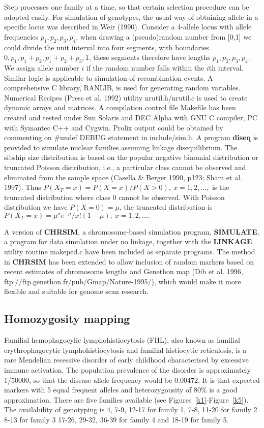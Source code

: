Step  processes one family at a time, so that certain selection
procedure can be adopted easily.  For simulation of genotypes, the usual way of
obtaining allele in a specific locus was described in Weir (1990).  Consider a
4-allele locus with allele frequencies $p_1, p_2, p_3, p_4$, when drawing a
(pseudo)random number from [0,1] we could divide the unit interval into four
segments, with boundaries $0, p_1, p_1+p_2, p_1+p_2+p_3, 1$, these segments
therefore have lengths $p_1, p_2, p_3, p_4$.  We assign allele number $i$ if
the random number falls within the $i$th interval.  Similar logic is applicable
to simulation of recombination events.  A comprehensive C library, RANLIB, is
used for generating random variables.  Numerical Recipes (Press et al.  1992)
utility nrutil.h/nrutil.c is used to create dynamic arrays and matrices.  A
compilation control file Makefile has been created and tested under Sun Solaris
and DEC Alpha with GNU C compiler, PC with Symantec C++ and Cygwin.  Prolix
output could be obtained by commenting on \#undef DEBUG statement in
include/sim.h.  A program {\bf diseq} is provided to simulate nuclear families
assuming linkage disequilibrium.  The sibship size distribution is based on the
popular negative binomial distribution or truncated Poisson distribution, i.e.,
a particular class cannot be observed and eliminated from the sample space
(Casella \& Berger 1990, p123; Sham et al.  1997).  Thus
$P(X_T=x)={P(X=x)}/{P(X>0)}, ~x=1,2,\ldots,$ is the truncated distribution
where class 0 cannot be observed.  With Poisson distribution we have
$P(X=0)=\mu$, the truncated distribution is
$P(X_T=x)={\mu^xe^{-\mu}}/{x!(1-\mu)}, ~x=1,2,\ldots.$

A version of {\bf CHRSIM}, a chromosome-based simulation program, {\bf
SIMULATE}, a program for data simulation under no linkage, together with the
{\bf LINKAGE} utility routine makeped.c have been included as separate
programs.  The method in {\bf CHRSIM} has been extended to allow inclusion of
random markers based on recent estimates of chromosome lengths and Genethon map
(Dib et al.  1996, ftp://ftp.genethon.fr/pub/Gmap/Nature-1995/), which would
make it more flexible and suitable for genome scan research.


\subsection*{Homozygosity mapping}

Familial hemophagocylic lymphohistiocytosis (FHL), also known as familial
erythrophagocytic lymphohistiocytosis and familial histiocytic reticulosis, is
a rare Mendelian recessive disorder of early childhood characterised by
excessive immune activation.  The population prevalence of the disorder is
approximately 1/50000, so that the disease allele frequency would be 0.00472.
It is that expected markers with 5 equal frequent alleles and heterozygousity
of 80\% is a good approximation.  There are five families available (see
Figures~\ref{k1}-Figure~\ref{k5}). The availability of genotyping is 4, 7-9,
12-17 for family 1, 7-8, 11-20 for family 2 8-13 for family 3 17-26, 29-32,
36-39 for family 4 and 18-19 for family 5.

